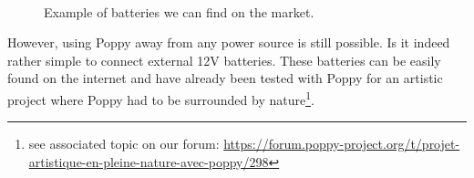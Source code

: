 \begin{figure}[tb]
\centering
    \hfil
    \\
    \caption{Example of batteries we can find on the market.}
    \label{fig:tyva_batteries}
\end{figure}

However, using Poppy away from any power source is still possible. Is it indeed rather simple to connect external 12V batteries. These batteries can be easily found on the internet and have already been tested with Poppy for an artistic project where Poppy had to be surrounded by nature\footnote{see associated topic on our forum: \url{https://forum.poppy-project.org/t/projet-artistique-en-pleine-nature-avec-poppy/298}}.

